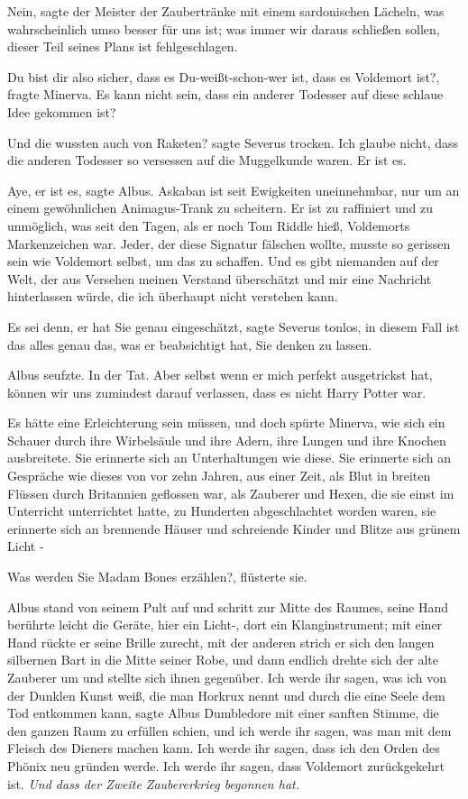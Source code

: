 \glqq{}Nein\grqq{}, sagte der Meister der Zaubertränke mit einem sardonischen
Lächeln, \glqq{}was wahrscheinlich umso besser für uns ist; was immer wir daraus
schließen sollen, dieser Teil seines Plans ist fehlgeschlagen.\grqq{}

\glqq{}Du bist dir also sicher, dass es Du-weißt-schon-wer ist, dass es Voldemort
ist?\grqq{}, fragte Minerva. \glqq{}Es kann nicht sein, dass ein anderer Todesser
auf diese schlaue Idee gekommen ist?\grqq{}

\glqq{}Und die wussten auch von Raketen?\grqq{} sagte Severus trocken. \glqq{}Ich
glaube nicht, dass die anderen Todesser so versessen auf die Muggelkunde waren.
Er ist es.\grqq{}

\glqq{}Aye, er ist es\grqq{}, sagte Albus. \glqq{}Askaban ist seit Ewigkeiten
uneinnehmbar, nur um an einem gewöhnlichen Animagus-Trank zu scheitern. Er ist
zu raffiniert und zu unmöglich, was seit den Tagen, als er noch Tom Riddle hieß,
Voldemorts Markenzeichen war. Jeder, der diese Signatur fälschen wollte, musste
so gerissen sein wie Voldemort selbst, um das zu schaffen. Und es gibt niemanden
auf der Welt, der aus Versehen meinen Verstand überschätzt und mir eine
Nachricht hinterlassen würde, die ich überhaupt nicht verstehen kann.\grqq{}

\glqq{}Es sei denn, er hat Sie genau eingeschätzt\grqq{}, sagte Severus tonlos,
\glqq{}in diesem Fall ist das alles genau das, was er beabsichtigt hat, Sie
denken zu lassen.\grqq{}

Albus seufzte. \glqq{}In der Tat. Aber selbst wenn er mich perfekt ausgetrickst
hat, können wir uns zumindest darauf verlassen, dass es nicht Harry Potter
war.\grqq{}

Es hätte eine Erleichterung sein müssen, und doch spürte Minerva, wie sich ein
Schauer durch ihre Wirbelsäule und ihre Adern, ihre Lungen und ihre Knochen
ausbreitete. Sie erinnerte sich an Unterhaltungen wie diese. Sie erinnerte sich
an Gespräche wie dieses von vor zehn Jahren, aus einer Zeit, als Blut in breiten
Flüssen durch Britannien geflossen war, als Zauberer und Hexen, die sie einst im
Unterricht unterrichtet hatte, zu Hunderten abgeschlachtet worden waren, sie
erinnerte sich an brennende Häuser und schreiende Kinder und Blitze aus grünem
Licht -

\glqq{}Was werden Sie Madam Bones erzählen?\grqq{}, flüsterte sie.

Albus stand von seinem Pult auf und schritt zur Mitte des Raumes, seine Hand
berührte leicht die Geräte, hier ein Licht-, dort ein Klanginstrument; mit einer
Hand rückte er seine Brille zurecht, mit der anderen strich er sich den langen
silbernen Bart in die Mitte seiner Robe, und dann endlich drehte sich der alte
Zauberer um und stellte sich ihnen gegenüber. \glqq{}Ich werde ihr sagen, was ich
von der Dunklen Kunst weiß, die man Horkrux nennt und durch die eine Seele dem
Tod entkommen kann\grqq{}, sagte Albus Dumbledore mit einer sanften Stimme, die
den ganzen Raum zu erfüllen schien, \glqq{}und ich werde ihr sagen, was man mit
dem Fleisch des Dieners machen kann. Ich werde ihr sagen, dass ich den Orden des
Phönix neu gründen werde. Ich werde ihr sagen, dass Voldemort zurückgekehrt ist.
\emph{Und dass der Zweite Zaubererkrieg begonnen hat.}\grqq{}

